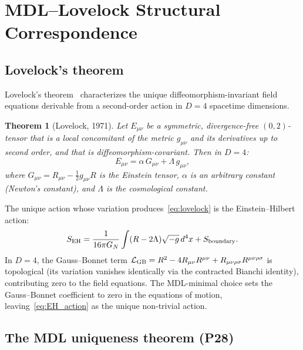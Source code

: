 \documentclass[11pt]{article}
\newtheorem{theorem}{Theorem}[section]
\theoremstyle{remark}
\begin{document}
\section{MDL--Lovelock Structural Correspondence}
\label{sec:mdl_lovelock}

\subsection{Lovelock's theorem}
\label{ssec:lovelock}

Lovelock's theorem~\cite{Lovelock1971} characterizes the unique
diffeomorphism-invariant field equations derivable from a second-order
action in $D = 4$ spacetime dimensions.

\begin{theorem}[Lovelock, 1971]
\label{thm:lovelock}
Let $E_{\mu\nu}$ be a symmetric, divergence-free $(0,2)$-tensor that is a
local concomitant of the metric $g_{\mu\nu}$ and its derivatives up to
second order, and that is diffeomorphism-covariant.
Then in $D = 4$:
\begin{equation}
  E_{\mu\nu} = \alpha \, G_{\mu\nu} + \Lambda \, g_{\mu\nu},
  \label{eq:lovelock}
\end{equation}
where $G_{\mu\nu} = R_{\mu\nu} - \tfrac{1}{2} g_{\mu\nu} R$ is the Einstein
tensor, $\alpha$ is an arbitrary constant (Newton's constant), and $\Lambda$
is the cosmological constant.
\end{theorem}

The unique action whose variation produces~\eqref{eq:lovelock} is the
Einstein--Hilbert action:
\begin{equation}
  S_{\rm EH} = \frac{1}{16\pi G_N} \int (R - 2\Lambda) \sqrt{-g}\, d^4x
  + S_{\rm boundary}.
  \label{eq:EH_action}
\end{equation}
In $D = 4$, the Gauss--Bonnet term $\mathcal{L}_{\rm GB} =
R^2 - 4R_{\mu\nu}R^{\mu\nu} + R_{\mu\nu\rho\sigma}R^{\mu\nu\rho\sigma}$
is topological (its variation vanishes identically via the contracted
Bianchi identity), contributing zero to the field equations.
The MDL-minimal choice sets the Gauss--Bonnet coefficient to zero in the
equations of motion, leaving~\eqref{eq:EH_action} as the unique
non-trivial action.

\subsection{The MDL uniqueness theorem (P28)}
\label{ssec:mdl_uniqueness}
\end{document}

